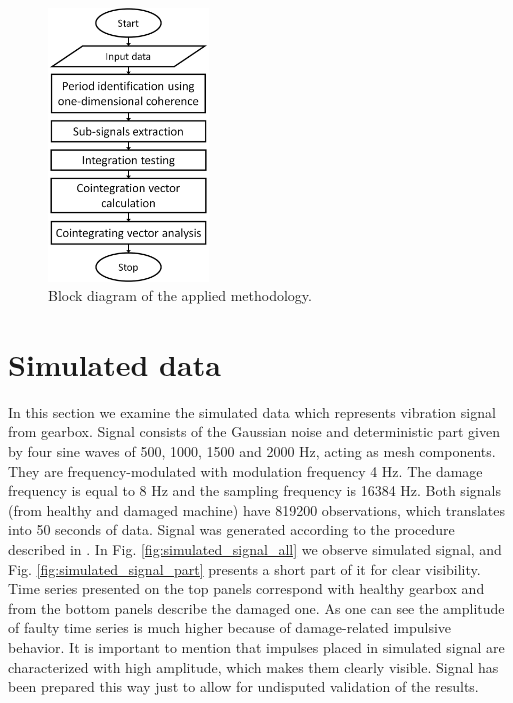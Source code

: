 \documentclass[preprint]{elsarticle}
\begin{document}
\begin{figure}[ht!]
\centering
\includegraphics[width=0.38\textwidth]{wykresy/block_diagram.png}
\caption{Block diagram of the applied methodology.}
\label{fig:algorytm}
\end{figure}

\section{Simulated data}

In this section we examine the simulated data which  represents vibration signal from gearbox. Signal consists of the Gaussian noise and deterministic part given by four sine waves of 500, 1000, 1500 and 2000 Hz, acting as mesh components. They are frequency-modulated with modulation frequency 4 Hz. The damage frequency is equal to 8 Hz and the sampling frequency is 16384 Hz. Both signals (from healthy and damaged machine)  have 819200 observations, which translates into 50 seconds of data. Signal was generated according to the procedure described in \cite{wylomanska2014periodic}. In Fig. \ref{fig:simulated_signal_all} we observe simulated signal, and Fig. \ref{fig:simulated_signal_part} presents a short part of it for clear visibility. Time series presented on the top panels correspond with healthy gearbox and from the bottom panels describe the damaged one. As one can see the amplitude of faulty time series is much higher because of damage-related impulsive behavior. It is important to mention that impulses placed in simulated signal are characterized with high amplitude, which makes them clearly visible. Signal has been prepared this way just to allow for undisputed validation of the results.
\end{document}
